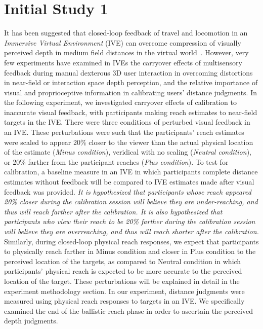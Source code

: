 
\chapter{Initial Study 1} \label{Study1}


It has been suggested that closed-loop feedback of travel and locomotion in an \textit{Immersive Virtual Environment} (IVE) can overcome compression of visually perceived depth in medium field distances in the virtual world~\cite{KCT13,MCT06}. However, very few experiments have examined in IVEs the carryover effects of multisensory feedback during manual dexterous 3D user interaction in overcoming distortions in near-field or interaction space depth perception, and the relative importance of visual and proprioceptive information in calibrating users’ distance judgments. In the following experiment, we investigated carryover effects of calibration to inaccurate visual feedback, with participants making reach estimates to near-field targets in the IVE. There were three conditions of perturbed visual feedback in an IVE. These perturbations were such that the participants' reach estimates were scaled to appear 20\% closer to the viewer than the actual physical location of the estimate (\textit{Minus condition}), veridical with no scaling (\textit{Neutral condition}), or 20\% farther from the participant reaches (\textit{Plus condition}). To test for calibration, a baseline measure in an IVE in which participants complete distance estimates without feedback will be compared to IVE estimates made after visual feedback was provided. \textit{It is hypothesized that participants whose reach appeared 20\% closer during the calibration session will believe they are under-reaching, and thus will reach farther after the calibration. It is also hypothesized that participants who view their reach to be 20\% farther during the calibration session will believe they are overreaching, and thus will reach shorter after the calibration.} Similarly, during closed-loop physical reach responses, we expect that participants to physically reach farther in Minus condition and closer in Plus condition to the perceived location of the targets, as compared to Neutral condition in which participants' physical reach is expected to be more accurate to the perceived location of the target. These perturbations will be explained in detail in the experiment methodology section. In our experiment, distance judgments were measured using physical reach responses to targets in an IVE. We specifically examined the end of the ballistic reach phase in order to ascertain the perceived depth judgments.


